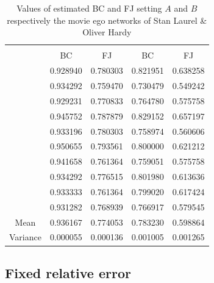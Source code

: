 \begin{table}[ht]
	\centering
	\begin{tabular}{l|l|l|l|l|}
		\cline{2-5}
		&\multicolumn{2}{c|}{\fsamp} & \multicolumn{2}{c|}{\base}\\
		\cline{2-5}
		& \multicolumn{1}{c|}{BC} & \multicolumn{1}{c|}{FJ} & \multicolumn{1}{c|}{BC} & \multicolumn{1}{c|}{FJ} \\
		\cline{2-5}
		& 0.928940                & 0.780303                & 0.821951                & 0.638258                \\
		& 0.934292                & 0.759470                & 0.730479                & 0.549242                \\
		& 0.929231                & 0.770833                & 0.764780                & 0.575758                \\
		& 0.945752                & 0.787879                & 0.829152                & 0.657197                \\
		& 0.933196                & 0.780303                & 0.758974                & 0.560606                \\
		& 0.950655                & 0.793561                & 0.800000                & 0.621212                \\
		& 0.941658                & 0.761364                & 0.759051                & 0.575758                \\
		& 0.934292                & 0.776515                & 0.801980                & 0.613636                \\
		& 0.933333                & 0.761364                & 0.799020                & 0.617424                \\
		& 0.931282                & 0.768939                & 0.766917                & 0.579545                \\
		\hline
		\multicolumn{1}{|c|}{Mean}     & 0.936167                & 0.774053                & 0.783230                & 0.598864                \\
		\multicolumn{1}{|c|}{Variance} & 0.000055                & 0.000136                & 0.001005                & 0.001265                \\
		\hline
	\end{tabular}
	\caption{Values of estimated BC and FJ setting $A$ and $B$ respectively the movie ego networks of Stan Laurel \& Oliver Hardy }
	\label{table:stanlio}
\end{table}
\subsection*{Fixed relative error}

